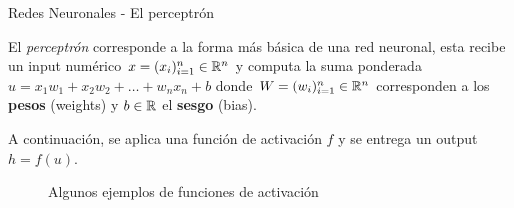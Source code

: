 \documentclass[9pt]{beamer}
\begin{document}
\begin{frame}{Redes Neuronales - El perceptrón}

El \textit{perceptrón} corresponde a la forma más básica de una red neuronal, esta recibe un input numérico $x = (x_i)_{i=1}^n \in \mathbb{R}^n$ y computa la suma ponderada $u = x_1w_1 + x_2w_2 + \dots + w_nx_n + b$ donde $W = (w_i)_{i=1}^n \in \mathbb{R}^n$ corresponden a los \textbf{pesos} (weights) y $b \in \mathbb{R}$ el \textbf{sesgo} (bias). \pause 

A continuación, se aplica una función de activación $f$ y se entrega un output $h = f(u)$. \pause 
\begin{figure}[H]
  \centering
  \caption{Algunos ejemplos de funciones de activación}
\end{figure}

\end{frame}
\end{document}
